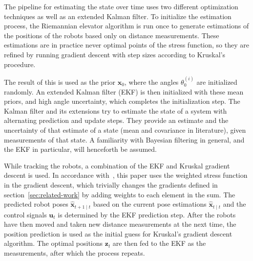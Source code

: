 The pipeline for estimating the state over time uses two different optimization techniques as well as an extended Kalman filter. To initialize the estimation process, the Riemannian elevator algorithm is run once to generate estimations of the positions of the robots based only on distance measurements. These estimations are in practice never optimal points of the stress function, so they are refined by running gradient descent with step sizes according to Kruskal's procedure. 

The result of this is used as the prior $\mathbf{x}_0$, where the angles $\theta_0^{(i)}$ are initialized randomly. An extended Kalman filter (EKF) is then initialized with these mean priors, and high angle uncertainty, which completes the initialization step. The Kalman filter and its extensions try to estimate the state of a system with alternating prediction and update steps. They provide an estimate and the uncertainty of that estimate of a state (mean and covariance in literature), given measurements of that state. A familiarity with Bayesian filtering in general, and the EKF in particular, will henceforth be assumed. 

While tracking the robots, a combination of the EKF and Kruskal gradient descent is used. In accordance with~\cite{R_elevator}, this paper uses the weighted stress function in the gradient descent, which trivially changes the gradients defined in section~\ref{sec:related-work} by adding weights to each element in the sum. The predicted robot poses $\hat{\mathbf{x}}_{t+1 \mid t}$ based on the current pose estimations $\hat{\mathbf{x}}_{t \mid t}$ and the control signals $\mathbf{u}_t$ is determined by the EKF prediction step. After the robots have then moved and taken new distance measurements at the next time, the position prediction is used as the initial guess for Kruskal's gradient descent algorithm. The optimal positions $\mathbf{z}_t$ are then fed to the EKF as the measurements, after which the process repeats. 

